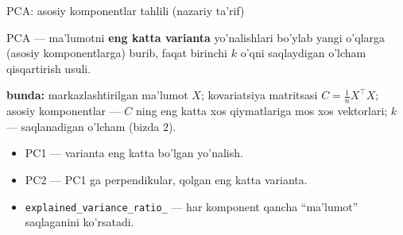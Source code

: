 \documentclass[aspectratio=169,11pt]{beamer}
\newcommand{\bunda}[1]{{\small\textbf{bunda:}\; #1}}
\begin{document}
\begin{frame}{PCA: asosiy komponentlar tahlili (nazariy ta'rif)}
  \begin{tcolorbox}[defbox,title=Ta'rif: PCA (Principal Component Analysis)]
    \small
    PCA --- ma'lumotni \textbf{eng katta varianta} yo'nalishlari bo'ylab
    yangi o'qlarga (asosiy komponentlarga) burib, faqat birinchi $k$
    o'qni saqlaydigan o'lcham qisqartirish usuli.
  \end{tcolorbox}
  \vspace{4pt}
  \bunda{markazlashtirilgan ma'lumot $X$; kovariatsiya matritsasi
  $C=\frac{1}{n}X^\top X$; asosiy komponentlar --- $C$ ning eng katta
  xos qiymatlariga mos xos vektorlari; $k$ --- saqlanadigan o'lcham (bizda $2$).}
  \vspace{5pt}
  \begin{itemize}\small\setlength\itemsep{3pt}
    \item PC1 --- varianta eng katta bo'lgan yo'nalish.
    \item PC2 --- PC1 ga perpendikular, qolgan eng katta varianta.
    \item \texttt{explained\_variance\_ratio\_} --- har komponent
          qancha ``ma'lumot'' saqlaganini ko'rsatadi.
  \end{itemize}
\end{frame}
\end{document}
